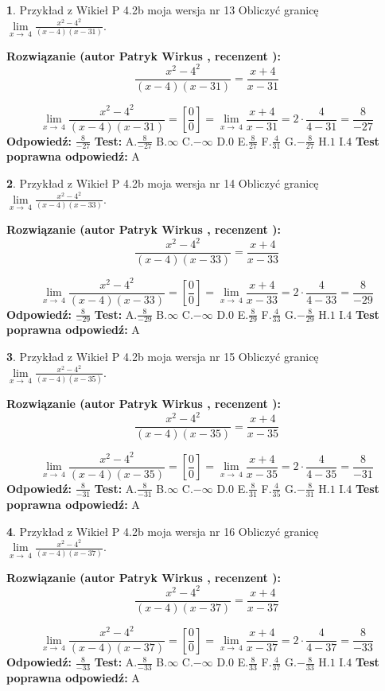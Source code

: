 \documentclass[12pt, a4paper]{article}
\theoremstyle{definition} %
\newtheorem{zad}{}
\newcommand{\zadStart}[1]{\begin{zad}#1\newline}
\newcommand{\zadStop}{\end{zad}}
\newcommand{\rozwStart}[2]{\noindent \textbf{Rozwiązanie (autor #1 , recenzent #2): }\newline}
\newcommand{\rozwStop}{\newline}
\newcommand{\odpStart}{\noindent \textbf{Odpowiedź:}\newline}
\newcommand{\odpStop}{\newline}
\newcommand{\testStart}{\noindent \textbf{Test:}\newline}
\newcommand{\testStop}{\newline}
\newcommand{\kluczStart}{\noindent \textbf{Test poprawna odpowiedź:}\newline}
\newcommand{\kluczStop}{\newline}
\begin{document}
\zadStart{Przykład z Wikieł P 4.2b moja wersja nr 13}
Obliczyć granicę $\lim\limits_{x\to\ 4}\frac{x^{2}-4^{2}}{(x-4)(x-31)}$.
\zadStop
\rozwStart{Patryk Wirkus}{}
$$\frac{x^{2}-4^{2}}{(x-4)(x-31)}=\frac{x+4}{x-31}$$

$$\lim\limits_{x\to\ 4}\frac{x^{2}-4^{2}}{(x-4)(x-31)}=[\frac{0}{0}]=\lim\limits_{x\to\ 4}\frac{x+4}{x-31}=2 \cdot \frac{4}{4-31} = \frac{8}{-27}$$
\rozwStop
\odpStart
$\frac{8}{-27}$
\odpStop
\testStart
A.$\frac{8}{-27}$
B.$\infty$
C.$-\infty$
D.$0$
E.$\frac{8}{27}$
F.$\frac{4}{31}$
G.$-\frac{8}{27}$
H.$1$
I.$4$
\testStop
\kluczStart
A
\kluczStop



\zadStart{Przykład z Wikieł P 4.2b moja wersja nr 14}
Obliczyć granicę $\lim\limits_{x\to\ 4}\frac{x^{2}-4^{2}}{(x-4)(x-33)}$.
\zadStop
\rozwStart{Patryk Wirkus}{}
$$\frac{x^{2}-4^{2}}{(x-4)(x-33)}=\frac{x+4}{x-33}$$

$$\lim\limits_{x\to\ 4}\frac{x^{2}-4^{2}}{(x-4)(x-33)}=[\frac{0}{0}]=\lim\limits_{x\to\ 4}\frac{x+4}{x-33}=2 \cdot \frac{4}{4-33} = \frac{8}{-29}$$
\rozwStop
\odpStart
$\frac{8}{-29}$
\odpStop
\testStart
A.$\frac{8}{-29}$
B.$\infty$
C.$-\infty$
D.$0$
E.$\frac{8}{29}$
F.$\frac{4}{33}$
G.$-\frac{8}{29}$
H.$1$
I.$4$
\testStop
\kluczStart
A
\kluczStop



\zadStart{Przykład z Wikieł P 4.2b moja wersja nr 15}
Obliczyć granicę $\lim\limits_{x\to\ 4}\frac{x^{2}-4^{2}}{(x-4)(x-35)}$.
\zadStop
\rozwStart{Patryk Wirkus}{}
$$\frac{x^{2}-4^{2}}{(x-4)(x-35)}=\frac{x+4}{x-35}$$

$$\lim\limits_{x\to\ 4}\frac{x^{2}-4^{2}}{(x-4)(x-35)}=[\frac{0}{0}]=\lim\limits_{x\to\ 4}\frac{x+4}{x-35}=2 \cdot \frac{4}{4-35} = \frac{8}{-31}$$
\rozwStop
\odpStart
$\frac{8}{-31}$
\odpStop
\testStart
A.$\frac{8}{-31}$
B.$\infty$
C.$-\infty$
D.$0$
E.$\frac{8}{31}$
F.$\frac{4}{35}$
G.$-\frac{8}{31}$
H.$1$
I.$4$
\testStop
\kluczStart
A
\kluczStop



\zadStart{Przykład z Wikieł P 4.2b moja wersja nr 16}
Obliczyć granicę $\lim\limits_{x\to\ 4}\frac{x^{2}-4^{2}}{(x-4)(x-37)}$.
\zadStop
\rozwStart{Patryk Wirkus}{}
$$\frac{x^{2}-4^{2}}{(x-4)(x-37)}=\frac{x+4}{x-37}$$

$$\lim\limits_{x\to\ 4}\frac{x^{2}-4^{2}}{(x-4)(x-37)}=[\frac{0}{0}]=\lim\limits_{x\to\ 4}\frac{x+4}{x-37}=2 \cdot \frac{4}{4-37} = \frac{8}{-33}$$
\rozwStop
\odpStart
$\frac{8}{-33}$
\odpStop
\testStart
A.$\frac{8}{-33}$
B.$\infty$
C.$-\infty$
D.$0$
E.$\frac{8}{33}$
F.$\frac{4}{37}$
G.$-\frac{8}{33}$
H.$1$
I.$4$
\testStop
\kluczStart
A
\kluczStop
\end{document}
